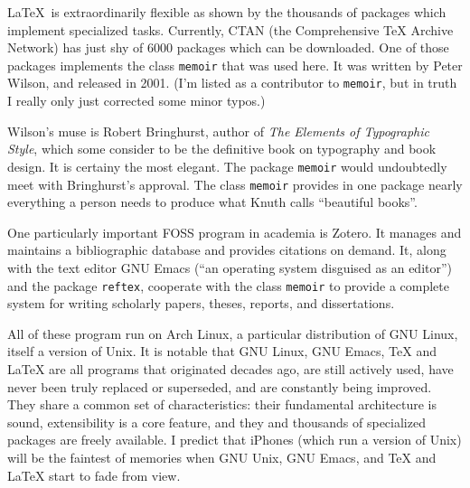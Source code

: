 LaTeX is extraordinarily flexible as shown by the thousands of packages which implement specialized tasks. Currently, CTAN (the Comprehensive TeX Archive Network) has just shy of 6000 packages which can be downloaded. One of those packages implements the class \texttt{memoir} that was used here. It was written by Peter Wilson, and released in 2001. (I'm listed as a contributor to \texttt{memoir}, but in truth I really only just corrected some minor typos.)
\newpage
\begin{center}
  \textbf{\quad\quad{}\quad\quad{}\quad\quad{}\quad\quad{}}
\end{center}
Wilson's muse is Robert Bringhurst, author of \textit{The Elements of Typographic Style}, which some consider to be the definitive book on typography and book design. It is certainy the most elegant. The package \texttt{memoir} would undoubtedly meet with Bringhurst's approval.  The class \texttt{memoir} provides in one package nearly everything a person needs to produce what Knuth calls ``beautiful books''.
\begin{center}
  \textbf{\quad\quad{}\quad\quad{}\quad\quad{}\quad\quad{}}
\end{center}
One particularly important FOSS program in academia is Zotero. It manages and maintains a bibliographic database and provides citations on demand. It, along with the text editor GNU Emacs (``an operating system disguised as an editor'') and the package \texttt{reftex}, cooperate with the class \texttt{memoir} to provide a complete system for writing scholarly papers, theses, reports, and dissertations.
\begin{center}
  \textbf{\quad\quad{}\quad\quad{}\quad\quad{}\quad\quad{}}
\end{center}
All of these program run on Arch Linux, a particular distribution of GNU Linux, itself a version of Unix. It is notable that GNU Linux, GNU Emacs, \TeX{} and \LaTeX{} are all programs that originated decades ago, are still actively used, have never been truly replaced or superseded, and are constantly being improved. They share a common set of characteristics: their fundamental architecture is sound, extensibility is a core feature, and they and thousands of specialized packages are freely available. I predict that iPhones (which run a version of Unix) will be the faintest of memories when GNU Unix, GNU Emacs, and \TeX{} and \LaTeX{} start to fade from view.

